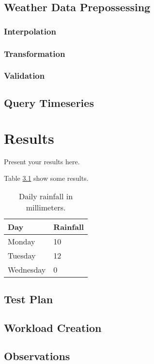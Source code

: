\documentclass[a4paper,oneside,12pt]{report}
\begin{document}
\section{Weather Data Prepossessing}

\subsection{Interpolation}

\subsection{Transformation}

\subsection{Validation}

\section{Query Timeseries}

\chapter{Results}
\label{ch:results}

Present your results here. 

Table \ref{ta:results} show some results.
\begin{table}
  \centering
  \begin{tabular}{|l|l|}
    \hline
    Day & Rainfall \\
    \hline
    Monday & 10\\
    Tuesday & 12\\
    Wednesday & 0\\
    \hline
  \end{tabular}
  \caption{Daily rainfall in millimeters.}\label{ta:results}
\end{table}

\section{Test Plan}

\section{Workload Creation}

\section{Observations}
\end{document}
